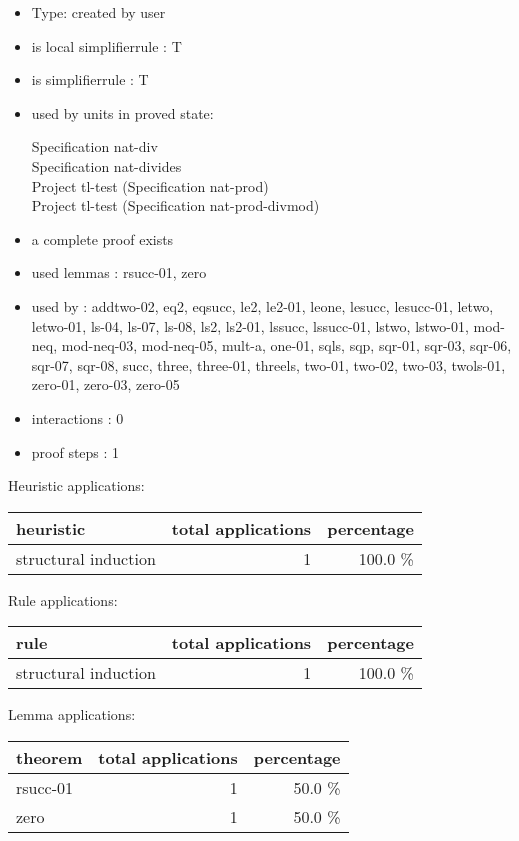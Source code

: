 \documentclass[a4paper]{article}
\begin{document}
\begin{itemize}

\item Type: created by user

\item is local simplifierrule : T
\item is simplifierrule : T
\item used by units in proved state:

Specification nat-div \\
Specification nat-divides \\
Project tl-test (Specification nat-prod) \\
Project tl-test (Specification nat-prod-divmod)
\item       a complete proof exists
\item       used lemmas  : rsucc-01, zero
\item       used by      : addtwo-02, eq2, eqsucc, le2, le2-01, leone, lesucc, lesucc-01, letwo, letwo-01, ls-04, ls-07, ls-08, ls2, ls2-01, lssucc, lssucc-01, lstwo, lstwo-01, mod-neq, mod-neq-03, mod-neq-05, mult-a, one-01, sqls, sqp, sqr-01, sqr-03, sqr-06, sqr-07, sqr-08, succ, three, three-01, threels, two-01, two-02, two-03, twols-01, zero-01, zero-03, zero-05
\item       interactions : 0
\item       proof steps  : 1
\end{itemize}

\medskip


Heuristic applications:

\begin{supertabular}{l|r|r}
heuristic	& total applications & percentage \\ \hline
structural induction & 1 & 100.0 \% \\

\end{supertabular}

Rule applications:

\begin{supertabular}{l|r|r}
rule	        & total applications & percentage \\ \hline
structural induction & 1 & 100.0 \% \\

\end{supertabular}

Lemma applications:

\begin{supertabular}{l|r|r}
theorem	        & total applications & percentage \\ \hline
rsucc-01 & 1 & 50.0 \% \\
zero & 1 & 50.0 \% \\

\end{supertabular}
\end{document}
